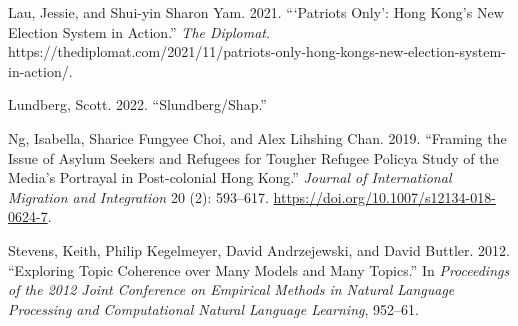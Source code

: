 \documentclass[a4paper, oneside]{report}
\begin{document}
\hypertarget{refs}{}
\begin{CSLReferences}{1}{0}
\leavevmode{}%
Lau, Jessie, and Shui-yin Sharon Yam. 2021. {``{`{Patriots Only}'}:
{Hong Kong}'s {New Election System} in {Action}.''} \emph{The Diplomat}.
https://thediplomat.com/2021/11/patriots-only-hong-kongs-new-election-system-in-action/.

\leavevmode{}%
Lundberg, Scott. 2022. {``Slundberg/Shap.''}

\leavevmode{}%
Ng, Isabella, Sharice Fungyee Choi, and Alex Lihshing Chan. 2019.
{``Framing the {Issue} of {Asylum Seekers} and {Refugees} for {Tougher
Refugee Policy}\textemdash a {Study} of the {Media}'s {Portrayal} in
{Post-colonial Hong Kong}.''} \emph{Journal of International Migration
and Integration} 20 (2): 593--617.
\url{https://doi.org/10.1007/s12134-018-0624-7}.

\leavevmode{}%
Stevens, Keith, Philip Kegelmeyer, David Andrzejewski, and David
Buttler. 2012. {``Exploring Topic Coherence over Many Models and Many
Topics.''} In \emph{Proceedings of the 2012 Joint Conference on
Empirical Methods in Natural Language Processing and Computational
Natural Language Learning}, 952--61.

\end{CSLReferences}




% 
\end{document}
